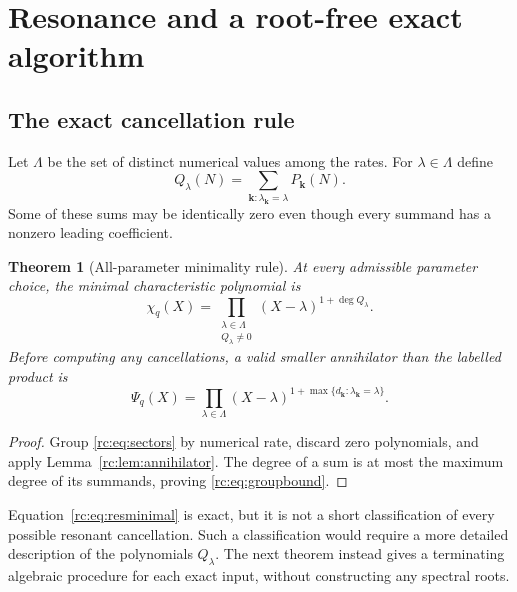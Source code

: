 \documentclass[11pt,a4paper]{article}
\numberwithin{equation}{section}
\newtheorem{theorem}{Theorem}[section]
\theoremstyle{definition}
\theoremstyle{remark}
\newcommand{\bk}{\boldsymbol{k}}
\begin{document}
\section{Resonance and a root-free exact algorithm}\label{rc:sec:resonances}

\subsection{The exact cancellation rule}
Let $\Lambda$ be the set of distinct numerical values among the rates.
For $\lambda\in\Lambda$ define
\begin{equation}\label{rc:eq:grouped}
 Q_\lambda(N)=\sum_{\bk:\lambda_{\bk}=\lambda}P_{\bk}(N).
\end{equation}
Some of these sums may be identically zero even though every summand
has a nonzero leading coefficient.

\begin{theorem}[All-parameter minimality rule]\label{rc:thm:resonant}
At every admissible parameter choice, the minimal characteristic
polynomial is
\begin{equation}\label{rc:eq:resminimal}
 \chi_q(X)=\prod_{\substack{\lambda\in\Lambda\\Q_\lambda\ne0}}
                    (X-\lambda)^{1+\deg Q_\lambda}.
\end{equation}
Before computing any cancellations, a valid smaller annihilator than
the labelled product is
\begin{equation}\label{rc:eq:groupbound}
 \Psi_q(X)=\prod_{\lambda\in\Lambda}
       (X-\lambda)^{1+\max\{d_{\bk}:\lambda_{\bk}=\lambda\}}.
\end{equation}
\end{theorem}
\begin{proof}
Group \eqref{rc:eq:sectors} by numerical rate, discard zero polynomials,
and apply Lemma~\ref{rc:lem:annihilator}.  The degree of a sum is at most
the maximum degree of its summands, proving \eqref{rc:eq:groupbound}.
\end{proof}

Equation~\eqref{rc:eq:resminimal} is exact, but it is not a short classification
of every possible resonant cancellation.  Such a classification would
require a more detailed description of the polynomials $Q_\lambda$.
The next theorem instead gives a terminating algebraic procedure for
each exact input, without constructing any spectral roots.

\noindent[Added 29 September 2026, batch 42: for a single repeated root
$q=\gamma(x-c)^t$, $c\notin\{0,4\}$, Part~III describes the grouped
polynomials exactly (Section~\ref{cyc:sec:proofmain}): after grouping, at
most one group loses further multiplicity, and exactly one, except at
$c=2$ (Theorems~\ref{cyc:thm:main} and~\ref{cyc:thm:central}).]
\end{document}
